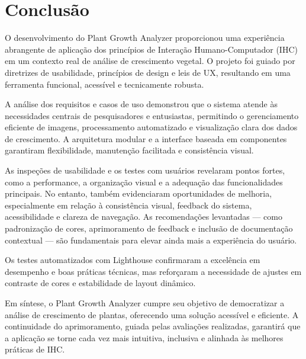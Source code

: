 \chapter{Conclusão}

O desenvolvimento do Plant Growth Analyzer proporcionou uma experiência abrangente de aplicação dos princípios de Interação Humano-Computador (IHC) em um contexto real de análise de crescimento vegetal. O projeto foi guiado por diretrizes de usabilidade, princípios de design e leis de UX, resultando em uma ferramenta funcional, acessível e tecnicamente robusta.

A análise dos requisitos e casos de uso demonstrou que o sistema atende às necessidades centrais de pesquisadores e entusiastas, permitindo o gerenciamento eficiente de imagens, processamento automatizado e visualização clara dos dados de crescimento. A arquitetura modular e a interface baseada em componentes garantiram flexibilidade, manutenção facilitada e consistência visual.

As inspeções de usabilidade e os testes com usuários revelaram pontos fortes, como a performance, a organização visual e a adequação das funcionalidades principais. No entanto, também evidenciaram oportunidades de melhoria, especialmente em relação à consistência visual, feedback do sistema, acessibilidade e clareza de navegação. As recomendações levantadas — como padronização de cores, aprimoramento de feedback e inclusão de documentação contextual — são fundamentais para elevar ainda mais a experiência do usuário.

Os testes automatizados com Lighthouse confirmaram a excelência em desempenho e boas práticas técnicas, mas reforçaram a necessidade de ajustes em contraste de cores e estabilidade de layout dinâmico.

Em síntese, o Plant Growth Analyzer cumpre seu objetivo de democratizar a análise de crescimento de plantas, oferecendo uma solução acessível e eficiente. A continuidade do aprimoramento, guiada pelas avaliações realizadas, garantirá que a aplicação se torne cada vez mais intuitiva, inclusiva e alinhada às melhores práticas de IHC.
